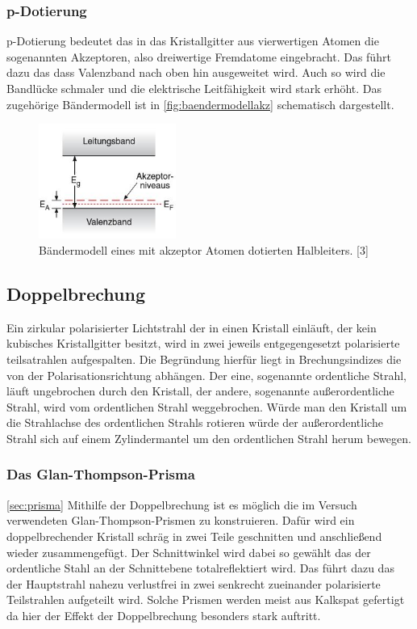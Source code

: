 \subsubsection{p-Dotierung}
\label{sec:pdotierung}
p-Dotierung bedeutet das in das Kristallgitter aus vierwertigen Atomen die sogenannten Akzeptoren, also
dreiwertige Fremdatome eingebracht. Das führt dazu das dass Valenzband nach oben hin ausgeweitet wird.
Auch so wird die Bandlücke schmaler und die elektrische Leitfähigkeit wird stark erhöht. Das zugehörige 
Bändermodell ist in \autoref{fig:baendermodellakz} schematisch dargestellt.
\begin{figure}
  \centering
  \includegraphics[width=0.4\textwidth]{content/grafiken/akzeptoren.JPG}
  \caption{Bändermodell eines mit akzeptor Atomen dotierten Halbleiters. [3]}
  \label{fig:baendermodellakz}
\end{figure}
\FloatBarrier

\subsection{Doppelbrechung}
\label{sec:doppelbrechung}
Ein zirkular polarisierter Lichtstrahl der in einen Kristall einläuft, der kein kubisches Kristallgitter 
besitzt, wird in zwei jeweils entgegengesetzt polarisierte teilsatrahlen aufgespalten. Die Begründung hierfür
liegt in Brechungsindizes die von der Polarisationsrichtung abhängen. Der eine, sogenannte ordentliche Strahl,
läuft ungebrochen durch den Kristall, der andere, sogenannte außerordentliche Strahl, wird vom ordentlichen
Strahl weggebrochen. Würde man den Kristall um die Strahlachse des ordentlichen Strahls rotieren würde der
außerordentliche Strahl sich auf einem Zylindermantel um den ordentlichen Strahl herum bewegen.
\subsubsection{Das Glan-Thompson-Prisma}
\autoref{sec:prisma}
Mithilfe der Doppelbrechung ist es möglich die im Versuch verwendeten Glan-Thompson-Prismen zu konstruieren.
Dafür wird ein doppelbrechender Kristall schräg in zwei Teile geschnitten und anschließend wieder zusammengefügt.
Der Schnittwinkel wird dabei so gewählt das der ordentliche Stahl an der Schnittebene totalreflektiert wird.
Das führt dazu das der Hauptstrahl nahezu verlustfrei in zwei senkrecht zueinander polarisierte Teilstrahlen 
aufgeteilt wird. Solche Prismen werden meist aus Kalkspat gefertigt da hier der Effekt der Doppelbrechung besonders
stark auftritt.
